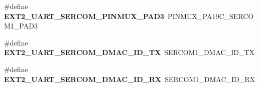 \begin{DoxyCompactItemize}
\item 
\hypertarget{group__saml21__xplained__pro__features__group_ga1618f9d133e1edfc216fb556101a37e6}{}\#define {\bfseries E\+X\+T2\+\_\+\+U\+A\+R\+T\+\_\+\+S\+E\+R\+C\+O\+M\+\_\+\+P\+I\+N\+M\+U\+X\+\_\+\+P\+A\+D3}~P\+I\+N\+M\+U\+X\+\_\+\+P\+A19\+C\+\_\+\+S\+E\+R\+C\+O\+M1\+\_\+\+P\+A\+D3\label{group__saml21__xplained__pro__features__group_ga1618f9d133e1edfc216fb556101a37e6}

\item 
\hypertarget{group__saml21__xplained__pro__features__group_gaedecf0445fac0f99d853b86ede2b6fbc}{}\#define {\bfseries E\+X\+T2\+\_\+\+U\+A\+R\+T\+\_\+\+S\+E\+R\+C\+O\+M\+\_\+\+D\+M\+A\+C\+\_\+\+I\+D\+\_\+\+T\+X}~S\+E\+R\+C\+O\+M1\+\_\+\+D\+M\+A\+C\+\_\+\+I\+D\+\_\+\+T\+X\label{group__saml21__xplained__pro__features__group_gaedecf0445fac0f99d853b86ede2b6fbc}

\item 
\hypertarget{group__saml21__xplained__pro__features__group_ga6f7d99bf930ce4bca3b0e258ef8f6eac}{}\#define {\bfseries E\+X\+T2\+\_\+\+U\+A\+R\+T\+\_\+\+S\+E\+R\+C\+O\+M\+\_\+\+D\+M\+A\+C\+\_\+\+I\+D\+\_\+\+R\+X}~S\+E\+R\+C\+O\+M1\+\_\+\+D\+M\+A\+C\+\_\+\+I\+D\+\_\+\+R\+X\label{group__saml21__xplained__pro__features__group_ga6f7d99bf930ce4bca3b0e258ef8f6eac}

\end{DoxyCompactItemize}
